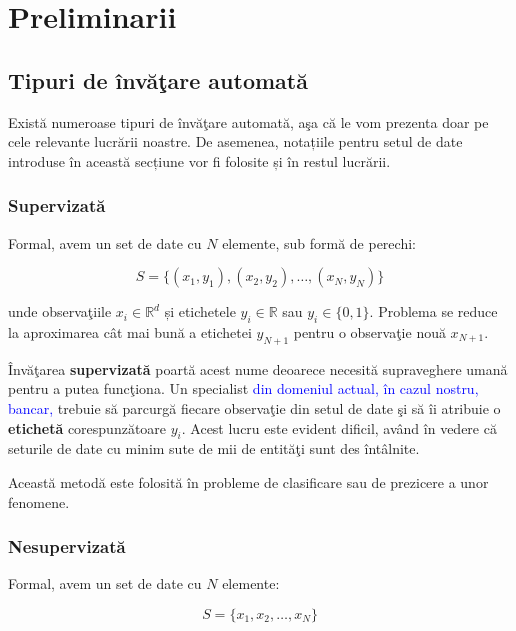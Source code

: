 \chapter{Preliminarii}

\section{Tipuri de învăţare automată}

Există numeroase tipuri de învăţare automată, aşa că le vom prezenta doar 
pe cele relevante lucrării noastre. De asemenea, notațiile pentru setul de 
date introduse în această secțiune vor fi folosite și în restul lucrării.

\subsection{Supervizată}

Formal, avem un set de date cu $N$ elemente, sub formă de perechi:

\begin{equation}
    S = \{(x_{1}, y_{1}), (x_{2}, y_{2}), \dots, (x_{N}, y_{N})\}
\end{equation}

unde observaţiile $x_{i} \in \mathbb{R} ^ d$ și etichetele 
$y_{i} \in \mathbb{R}$ sau $y_{i} \in \{0, 1\}$. 
Problema se reduce la 
aproximarea cât mai bună a etichetei $y_{N + 1}$ pentru o observaţie nouă 
$x_{N + 1}$.

Învăţarea \textbf{supervizată} poartă acest nume deoarece necesită supraveghere 
umană pentru a putea funcţiona. Un specialist \textcolor{blue}
{din domeniul actual, în cazul 
nostru, bancar,} trebuie 
să parcurgă fiecare observaţie din setul de date şi să îi atribuie 
o \textbf{etichetă} corespunzătoare $y_{i}$. Acest lucru este evident dificil, având în 
vedere că seturile de date cu minim sute de mii de entităţi sunt des întâlnite.

Această metodă este folosită în probleme de clasificare sau de prezicere 
a unor fenomene.

\subsection{Nesupervizată}

Formal, avem un set de date cu $N$ elemente:

\begin{equation}
    S = \{x_{1}, x_{2}, \dots, x_{N}\}
\end{equation}

